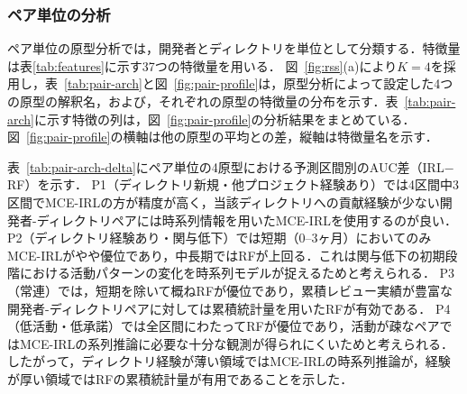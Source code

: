 \documentclass[submit,noauthor,ses,dvipdfmx]{ipsj}
\begin{document}
\subsubsection{ペア単位の分析}\label{sec:pair-arch}

ペア単位の原型分析では，開発者とディレクトリを単位として分類する．特徴量は表\ref{tab:features}に示す37つの特徴量を用いる．
図~\ref{fig:rss}(a)により$K = 4$を採用し，表~\ref{tab:pair-arch}と図~\ref{fig:pair-profile}は，原型分析によって設定した4つの原型の解釈名，および，それぞれの原型の特徴量の分布を示す．表~\ref{tab:pair-arch}に示す特徴の列は，図~\ref{fig:pair-profile}の分析結果をまとめている．図~\ref{fig:pair-profile}の横軸は他の原型の平均との差，縦軸は特徴量名を示す．

表~\ref{tab:pair-arch-delta}にペア単位の4原型における予測区間別のAUC差（IRL$-$RF）を示す．
P1（ディレクトリ新規・他プロジェクト経験あり）では4区間中3区間でMCE-IRLの方が精度が高く，当該ディレクトリへの貢献経験が少ない開発者-ディレクトリペアには時系列情報を用いたMCE-IRLを使用するのが良い．
P2（ディレクトリ経験あり・関与低下）では短期（0--3ヶ月）においてのみMCE-IRLがやや優位であり，中長期ではRFが上回る．これは関与低下の初期段階における活動パターンの変化を時系列モデルが捉えるためと考えられる．
P3（常連）では，短期を除いて概ねRFが優位であり，累積レビュー実績が豊富な開発者-ディレクトリペアに対しては累積統計量を用いたRFが有効である．
P4（低活動・低承諾）では全区間にわたってRFが優位であり，活動が疎なペアではMCE-IRLの系列推論に必要な十分な観測が得られにくいためと考えられる．
したがって，ディレクトリ経験が薄い領域ではMCE-IRLの時系列推論が，経験が厚い領域ではRFの累積統計量が有用であることを示した．


\end{document}

